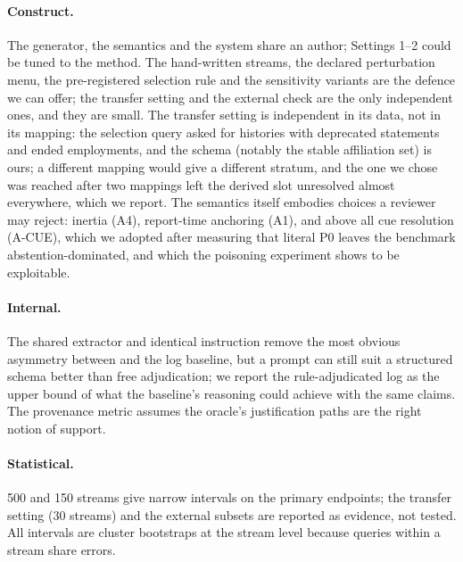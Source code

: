 \paragraph{Construct.} The generator, the semantics and the system share an author; Settings 1--2 could be tuned to the method. The hand-written streams, the declared perturbation menu, the pre-registered selection rule and the sensitivity variants are the defence we can offer; the transfer setting and the external check are the only independent ones, and they are small. The transfer setting is independent in its data, not in its mapping: the selection query asked for histories with deprecated statements and ended employments, and the schema (notably the stable affiliation set) is ours; a different mapping would give a different stratum, and the one we chose was reached after two mappings left the derived slot unresolved almost everywhere, which we report. The semantics itself embodies choices a reviewer may reject: inertia (A4), report-time anchoring (A1), and above all cue resolution (A-CUE), which we adopted after measuring that literal P0 leaves the benchmark abstention-dominated, and which the poisoning experiment shows to be exploitable.
\paragraph{Internal.} The shared extractor and identical instruction remove the most obvious asymmetry between \pal{} and the log baseline, but a prompt can still suit a structured schema better than free adjudication; we report the rule-adjudicated log as the upper bound of what the baseline's reasoning could achieve with the same claims. The provenance metric assumes the oracle's justification paths are the right notion of support.
\paragraph{Statistical.} 500 and 150 streams give narrow intervals on the primary endpoints; the transfer setting (30 streams) and the external subsets are reported as evidence, not tested. All intervals are cluster bootstraps at the stream level because queries within a stream share errors.
